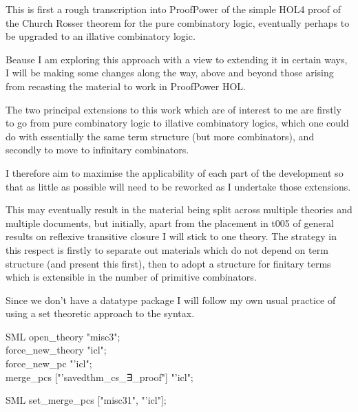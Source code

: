 \def\VCDate{2025/06/01}\def\VCVersion{8d15189}

This is first a rough transcription into ProofPower of the simple HOL4 proof of the Church Rosser theorem for the pure combinatory logic, eventually perhaps to be upgraded to an illative combinatory logic.

Beause I am exploring this approach with a view to extending it in certain ways, I will be making some changes along the way, above and beyond those arising from recasting the material to work in ProofPower HOL.

The two principal extensions to this work which are of interest to me are firstly to go from pure combinatory logic to illative combinatory logics, which one could do with essentially the same term structure (but more combinators), and secondly to move to infinitary combinators.

I therefore aim to maximise the applicability of each part of the development so that as little as possible will need to be reworked as I undertake those extensions.

This may eventually result in the material being split across multiple theories and multiple documents, but initially, apart from the placement in t005 \cite{rbjt005} of general results on reflexive transitive closure I will stick to one theory.
The strategy in this respect is firstly to separate out materials which do not depend on term structure (and present this first), then to adopt a structure for finitary terms which is extensible in the number of primitive combinators.


Since we don't have a datatype package I will follow my own usual practice of using a set theoretic approach to the syntax.


\begin{GFT}{SML}
\+open\_theory "misc3";\\
\+force\_new\_theory "\PrNL{}icl\PrNN{}";\\
\+force\_new\_pc \PrNL{}"'icl"\PrNN{};\\
\+merge\_pcs ["'savedthm\_cs\_∃\_proof"] "'icl";\\
\end{GFT}
\begin{GFT}{SML}
\+set\_merge\_pcs ["misc31", "'icl"];\\
\end{GFT}

